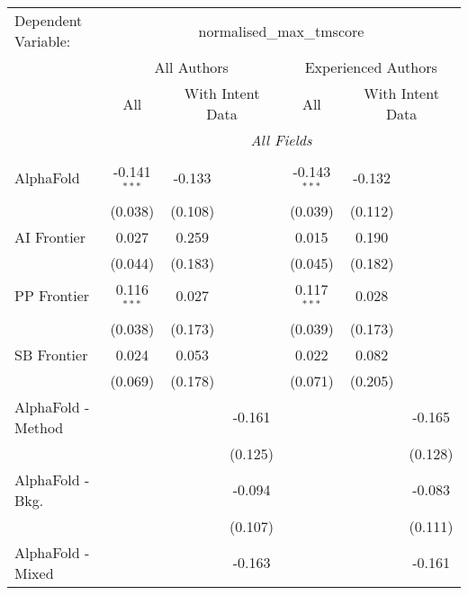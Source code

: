 \begingroup
\centering
\begin{tabular}{lcccccc}
   \tabularnewline \midrule \midrule
   Dependent Variable: & \multicolumn{6}{c}{normalised\_max\_tmscore}\\
 & \multicolumn{3}{c}{All Authors} & \multicolumn{3}{c}{Experienced Authors} \\
\cmidrule(lr){2-4} \cmidrule(lr){5-7}
 & \multicolumn{1}{c}{All} & \multicolumn{2}{c}{With Intent Data} & \multicolumn{1}{c}{All} & \multicolumn{2}{c}{With Intent Data} \\
\cmidrule(lr){2-2} \cmidrule(lr){3-4} \cmidrule(lr){5-5} \cmidrule(lr){6-7}
 & \multicolumn{6}{c}{\textit{All Fields}} \\ \\
   AlphaFold            & -0.141$^{***}$ & -0.133  &            & -0.143$^{***}$ & -0.132  &   \\   
                        & (0.038)        & (0.108) &            & (0.039)        & (0.112) &   \\   
   AI Frontier          & 0.027          & 0.259   &            & 0.015          & 0.190   &   \\   
                        & (0.044)        & (0.183) &            & (0.045)        & (0.182) &   \\   
   PP Frontier          & 0.116$^{***}$  & 0.027   &            & 0.117$^{***}$  & 0.028   &   \\   
                        & (0.038)        & (0.173) &            & (0.039)        & (0.173) &   \\   
   SB Frontier          & 0.024          & 0.053   &            & 0.022          & 0.082   &   \\   
                        & (0.069)        & (0.178) &            & (0.071)        & (0.205) &   \\   
   AlphaFold - Method   &                &         & -0.161     &                &         & -0.165\\   
                        &                &         & (0.125)    &                &         & (0.128)\\   
   AlphaFold - Bkg.     &                &         & -0.094     &                &         & -0.083\\   
                        &                &         & (0.107)    &                &         & (0.111)\\   
   AlphaFold - Mixed    &                &         & -0.163     &                &         & -0.161\\   

\end{tabular}
